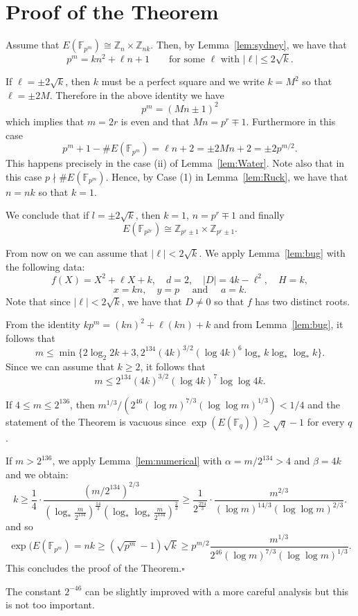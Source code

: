 \documentclass{amsart}
\def\Z{{\mathbb Z}}
\def\F{{\mathbb F}}
\begin{document}
\section{Proof of the Theorem}
Assume that 
$E(\F_{p^m})\cong\Z_n\times\Z_{nk}.$ Then, by Lemma~\ref{lem:sydney}, we have that
$$p^m=kn^2+\ell n+1\qquad\text{for some }\ell\text{ with }|\ell|\le2\sqrt{k}.$$

If $\ell=\pm2\sqrt{k}$, then $k$ must be a perfect square and we write $k=M^2$ so that
$\ell=\pm2M$. Therefore in the
above identity we have
$$p^m=(Mn\pm1)^2$$
which implies that $m=2r$ is even and that $Mn=p^r\mp1$. Furthermore in this case
$$p^m+1-\#E(\F_{p^m})=\ell n+2=\pm2Mn+2=\pm2p^{m/2}.$$
This happens precisely in the case (ii) of Lemma~\ref{lem:Water}. Note also that
in this case $p\nmid\#E(\F_{p^m})$. Hence, by Case (1) in Lemma~\ref{lem:Ruck}, we
have that $n=nk$ so that $k=1$.

We conclude that if $l=\pm2\sqrt{k}$, then $k=1$, $n=p^{r}\mp1$ and finally
$$E(\F_{p^{2r}})\cong\Z_{p^r\pm1}\times\Z_{p^r\pm1}.$$

From now on we can assume that $|\ell|<2\sqrt{k}.$ 
We apply Lemma~\ref{lem:bug} with the following data:
$$f(X)=X^2+\ell X+k,\quad d=2,\quad |D|=4k-\ell^2,\quad H=k,$$
$$ x=kn,\quad y=p\quad\text{ and }\quad a=k.$$ 
Note that since $|\ell|<2\sqrt{k}$, we have that $D\neq0$ so that $f$ has
two distinct roots.

From the identity $kp^m=(kn)^2+\ell(kn)+k$ and from Lemma~\ref{lem:bug}, 
it follows that
$$m\le\min\{2\log_{2}2k+3,2^{134}(4k)^{3/2}(\log4k)^6\log_*k\log_*\log_*k\}.$$
Since we can assume that $k\ge2$, it follows that
$$m\le2^{134}(4k)^{3/2}(\log4k)^{7}\log\log4k.$$

If $4\le m\le 2^{136}$, then 
$m^{1/3}/(2^{46}(\log m)^{7/3}(\log\log m)^{1/3}) <1/4$ and the statement of the Theorem is vacuous 
since $\exp(E(\F_q))\ge\sqrt{q}-1$ for every $q$.
 
If $m>2^{136}$, we apply Lemma~\ref{lem:numerical} with $\alpha=m/2^{134}>4$ and $\beta=4k$ and we obtain:
$$k\ge\frac14\cdot\frac{(m/2^{134})^{2/3}}{(\log_* \frac m{2^{134}})^{\frac{14}3}(\log_*\log_* \frac m{2^{134}})^{\frac23}}
\ge
\frac1{2^{\frac{274}3}}\cdot\frac{m^{2/3}}{(\log m)^{14/3}(\log\log m)^{2/3}}.
$$
and so
$$\exp(E(\F_{p^m})=nk\ge (\sqrt{p^m}-1)\sqrt{k}\ge p^{m/2}\frac{m^{1/3}}{2^{46}(\log m)^{7/3}(\log\log m)^{1/3}}.$$
This concludes the proof of the Theorem.\hfill$\square$\bigskip

The constant $2^{-46}$ can be slightly improved with a more careful analysis but this
is not too important.
\end{document}
